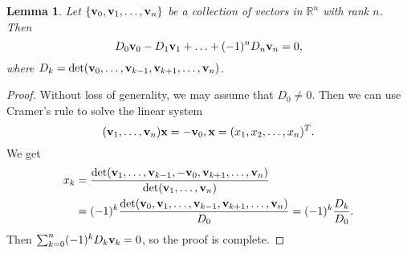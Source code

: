 \documentclass[12pt]{amsart}
\newtheorem{lemma}{Lemma}
\theoremstyle{definition}
\def \mb{\mathbb}
\def \R{\mb R}                 %
\def\v{{\bf v}}
\begin{document}
{\begin{lemma}
Let $\{\v_0, \v_1, \ldots, \v_n\}$ be a collection of vectors in $\R^n$ with rank $n$. Then $$D_0\v_0-D_1\v_1+\ldots+(-1)^nD_n\v_n=0,$$
where $D_k=\det(\v_0,\ldots, \v_{k-1},\v_{k+1}, \ldots, \v_n)$.\end{lemma}
\begin{proof}
Without loss of generality, we may assume that $D_0 \neq 0$. Then we can use Cramer's rule to solve the linear system $$(\v_1,\ldots, \v_n)\mathbf{x}=-\v_0, \mathbf{x}=(x_1, x_2, \ldots, x_n)^T.$$ We get \begin{align*}
x_k&=\frac{\det(\v_1, \ldots, \v_{k-1}, -\v_0, \v_{k+1}, \ldots, \v_n)}{\det(\v_1, \ldots, \v_n)}\\
&=(-1)^k\frac{\det(\v_0, \v_1, \ldots, \v_{k-1}, \v_{k+1}, \ldots, \v_n)}{D_0}=(-1)^k\frac{D_k}{D_0}.\end{align*}
Then $\sum_{k=0}^n (-1)^k D_k\v_k=0$, so the proof is complete.
\end{proof}

}
\end{document}
